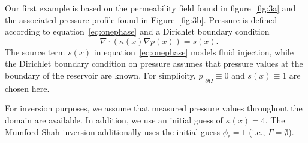 \documentclass[manuscript,revised]{geophysics}
\begin{document}
Our first example is based on the permeability field found in figure~\ref{fig:3a} and the associated pressure profile found in Figure~\ref{fig:3b}.  Pressure is defined according to equation~\ref{eq:onephase} and a Dirichlet boundary condition
\begin{equation} \label{eq:onephase}
-\nabla \cdot \left( \kappa (x)\nabla p(x) \right)=s(x).
\end{equation}
The source term $s(x)$ in equation~\ref{eq:onephase} models fluid injection, while the Dirichlet boundary condition on pressure assumes that pressure values at the boundary of the reservoir are known.  For simplicity, $p\vert_{\partial\Omega} \equiv 0$ and $s(x) \equiv 1$ are chosen here. 

For inversion purposes, we assume that measured pressure values throughout the domain are available.  In addition, we use an initial guess of $\kappa(x)=4$.  The Mumford-Shah-inversion additionally uses the initial guess $\phi_\epsilon=1$ (i.e., $\Gamma=\emptyset$).
\end{document}
